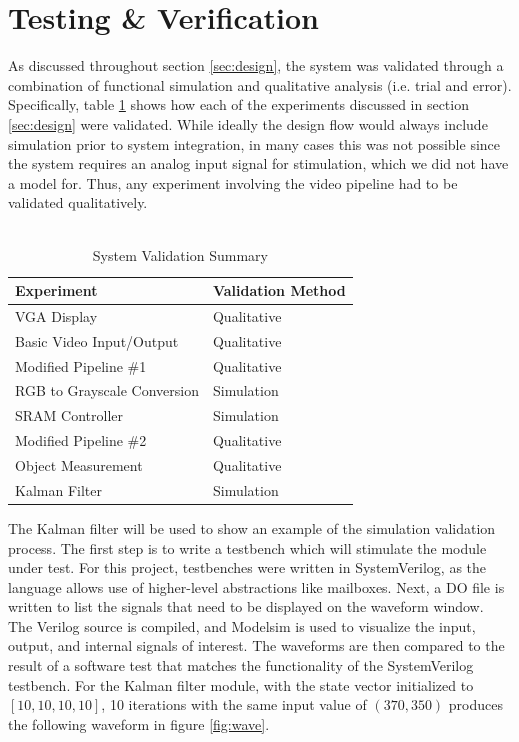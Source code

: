 \documentclass[11pt]{article} %
\begin{document}
\section{Testing \& Verification}
\label{sec:sim}
As discussed throughout section \ref{sec:design}, the system was validated through a combination of functional simulation and qualitative analysis (i.e. trial and error). Specifically, table \ref{table:testing} shows how each of the experiments discussed in section \ref{sec:design} were validated. While ideally the design flow would always include simulation prior to system integration, in many cases this was not possible since the system requires an analog input signal for stimulation, which we did not have a model for. Thus, any experiment involving the video pipeline had to be validated qualitatively. \\\\
\begin{table}[h]
\centering
\caption{System Validation Summary}
\label{table:testing}
 \begin{tabular}{ | p{6cm} | p{4cm} |} \hline
 \textbf{Experiment} & \textbf{Validation Method}  \\ \hline
VGA Display & Qualitative \\ \hline
Basic Video Input/Output & Qualitative \\ \hline
Modified Pipeline \#1 & Qualitative \\ \hline
RGB to Grayscale Conversion & Simulation \\ \hline
SRAM Controller & Simulation \\ \hline
Modified Pipeline \#2 & Qualitative \\ \hline
Object Measurement & Qualitative \\ \hline
Kalman Filter & Simulation \\ \hline
\end{tabular}
\end{table}
The Kalman filter will be used to show an example of the simulation validation process. The first step is to write a testbench which will stimulate the module under test. For this project, testbenches were written in SystemVerilog, as the language allows use of higher-level abstractions like mailboxes. Next, a DO file is written to list the signals that need to be displayed on the waveform window. The Verilog source is compiled, and Modelsim is used to visualize the input, output, and internal signals of interest. The waveforms are then compared to the result of a software test that matches the functionality of the SystemVerilog testbench. For the Kalman filter module, with the state vector initialized to $[10,10,10,10]$, 10 iterations with the same input value of $(370,350)$ produces the following waveform in figure \ref{fig:wave}.
\end{document}
